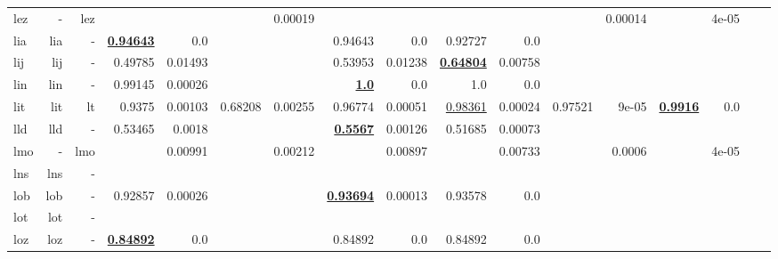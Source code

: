 \documentclass[11pt]{article}
\begin{document}
\begin{table*}[h]
{\begin{tabular}{lrrrrrrrrrrrrrrrr}
lez         & -         & lez         &          &          &          & 0.00019         &          &          &          &          &          & 0.00014         &          & 4e-05         \\
lia         & lia         & -         & \textbf{\underline{0.94643}}         & 0.0         &          &          & 0.94643         & 0.0         & 0.92727         & 0.0         &          &          &          &          \\
lij         & lij         & -         & 0.49785         & 0.01493         &          &          & 0.53953         & 0.01238         & \textbf{\underline{0.64804}}         & 0.00758         &          &          &          &          \\
lin         & lin         & -         & 0.99145         & 0.00026         &          &          & \textbf{\underline{1.0}}         & 0.0         & 1.0         & 0.0         &          &          &          &          \\
lit         & lit         & lt         & 0.9375         & 0.00103         & 0.68208         & 0.00255         & 0.96774         & 0.00051         & \underline{0.98361}         & 0.00024         & 0.97521         & 9e-05         & \textbf{\underline{0.9916}}         & 0.0         \\
lld         & lld         & -         & 0.53465         & 0.0018         &          &          & \textbf{\underline{0.5567}}         & 0.00126         & 0.51685         & 0.00073         &          &          &          &          \\
lmo         & -         & lmo         &          & 0.00991         &          & 0.00212         &          & 0.00897         &          & 0.00733         &          & 0.0006         &          & 4e-05         \\
lns         & lns         & -         &          &          &          &          &          &          &          &          &          &          &          &          \\
lob         & lob         & -         & 0.92857         & 0.00026         &          &          & \textbf{\underline{0.93694}}         & 0.00013         & 0.93578         & 0.0         &          &          &          &          \\
lot         & lot         & -         &          &          &          &          &          &          &          &          &          &          &          &          \\
loz         & loz         & -         & \textbf{\underline{0.84892}}         & 0.0         &          &          & 0.84892         & 0.0         & 0.84892         & 0.0         &          &          &          &          \\

\end{tabular}}
\end{table*}
\end{document}
